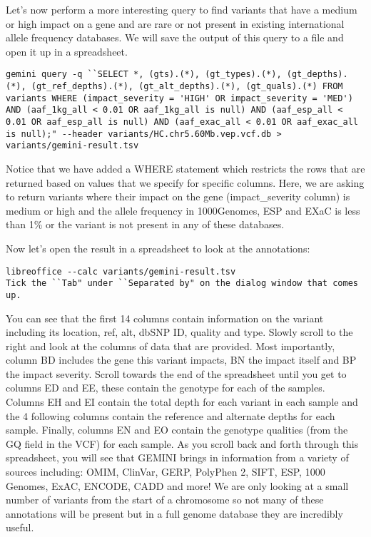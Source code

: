 \begin{steps}
Let's now perform a more interesting query to find variants that have a medium or high impact on a gene and are rare or not present in existing international allele frequency databases. We will save the output of this query to a file and open it up in a spreadsheet.
\begin{lstlisting}
gemini query -q ``SELECT *, (gts).(*), (gt_types).(*), (gt_depths).(*), (gt_ref_depths).(*), (gt_alt_depths).(*), (gt_quals).(*) FROM variants WHERE (impact_severity = 'HIGH' OR impact_severity = 'MED') AND (aaf_1kg_all < 0.01 OR aaf_1kg_all is null) AND (aaf_esp_all < 0.01 OR aaf_esp_all is null) AND (aaf_exac_all < 0.01 OR aaf_exac_all is null);" --header variants/HC.chr5.60Mb.vep.vcf.db > variants/gemini-result.tsv
\end{lstlisting}
\end{steps}

Notice that we have added a WHERE statement which restricts the rows that are returned based on values that we specify for specific columns. Here, we are asking to return variants where their impact on the gene (impact\_severity column) is medium or high and the allele frequency in 1000Genomes, ESP and EXaC is less than 1\% or the variant is not present in any of these databases.\\

\begin{steps}
Now let's open the result in a spreadsheet to look at the annotations:
\begin{lstlisting}
libreoffice --calc variants/gemini-result.tsv
Tick the ``Tab" under ``Separated by" on the dialog window that comes up.
\end{lstlisting}
\end{steps}

You can see that the first 14 columns contain information on the variant including its location, ref, alt, dbSNP ID, quality and type. Slowly scroll to the right and look at the columns of data that are provided. Most importantly, column BD includes the gene this variant impacts, BN the impact itself and BP the impact severity. Scroll towards the end of the spreadsheet until you get to columns ED and EE, these contain the genotype for each of the samples. Columns EH and EI contain the total depth for each variant in each sample and the 4 following columns contain the reference and alternate depths for each sample. Finally, columns EN and EO contain the genotype qualities (from the GQ field in the VCF) for each sample. As you scroll back and forth through this spreadsheet, you will see that GEMINI brings in information from a variety of sources including: OMIM, ClinVar, GERP, PolyPhen 2, SIFT, ESP, 1000 Genomes, ExAC, ENCODE, CADD and more! We are only looking at a small number of variants from the start of a chromosome so not many of these annotations will be present but in a full genome database they are incredibly useful.

